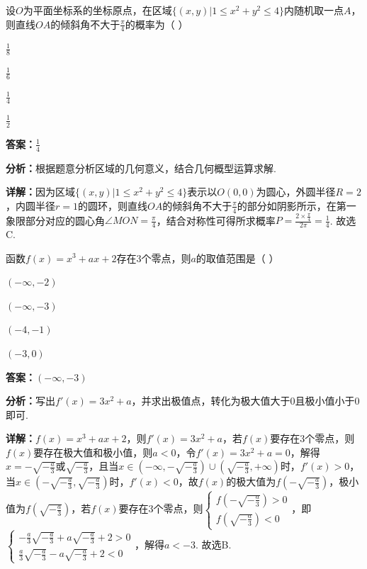 \begin{question}[points=5]
设$O$为平面坐标系的坐标原点，在区域$\{(x,y)|1\le x^2+y^2\le 4\}$内随机取一点$A$，则直线$OA$的倾斜角不大于$\frac{\pi}{4}$的概率为（   ）
\begin{choices}
  \item $\frac{1}{8}$
  \item $\frac{1}{6}$
  \item $\frac{1}{4}$
  \item $\frac{1}{2}$
\end{choices}
\begin{solution}
\textbf{答案：}$\frac{1}{4}$

\textbf{分析：}根据题意分析区域的几何意义，结合几何概型运算求解.

\textbf{详解：}因为区域$\{(x,y)|1\le x^2+y^2\le 4\}$表示以$O(0,0)$为圆心，外圆半径$R=2$，内圆半径$r=1$的圆环，则直线$OA$的倾斜角不大于$\frac{\pi}{4}$的部分如阴影所示，在第一象限部分对应的圆心角$\angle MON=\frac{\pi}{4}$，结合对称性可得所求概率$P=\frac{2\times\frac{\pi}{4}}{2\pi}=\frac{1}{4}$. 故选C.
\end{solution}
\end{question}

\begin{question}[points=5]
函数$f(x)=x^3+ax+2$存在3个零点，则$a$的取值范围是（   ）
\begin{choices}
  \item $(-\infty,-2)$
  \item $(-\infty,-3)$
  \item $(-4,-1)$
  \item $(-3,0)$
\end{choices}
\begin{solution}
\textbf{答案：}$(-\infty,-3)$

\textbf{分析：}写出$f'(x)=3x^2+a$，并求出极值点，转化为极大值大于0且极小值小于0即可.

\textbf{详解：}$f(x)=x^3+ax+2$，则$f'(x)=3x^2+a$，若$f(x)$要存在3个零点，则$f(x)$要存在极大值和极小值，则$a<0$，令$f'(x)=3x^2+a=0$，解得$x=-\sqrt{-\frac{a}{3}}$或$\sqrt{-\frac{a}{3}}$，且当$x\in(-\infty,-\sqrt{-\frac{a}{3}})\cup(\sqrt{-\frac{a}{3}},+\infty)$时，$f'(x)>0$，当$x\in(-\sqrt{-\frac{a}{3}},\sqrt{-\frac{a}{3}})$时，$f'(x)<0$，故$f(x)$的极大值为$f(-\sqrt{-\frac{a}{3}})$，极小值为$f(\sqrt{-\frac{a}{3}})$，若$f(x)$要存在3个零点，则$\begin{cases}f(-\sqrt{-\frac{a}{3}})>0\\f(\sqrt{-\frac{a}{3}})<0\end{cases}$，即$\begin{cases}-\frac{a}{3}\sqrt{-\frac{a}{3}}+a\sqrt{-\frac{a}{3}}+2>0\\\frac{a}{3}\sqrt{-\frac{a}{3}}-a\sqrt{-\frac{a}{3}}+2<0\end{cases}$，解得$a<-3$. 故选B.
\end{solution}
\end{question}

